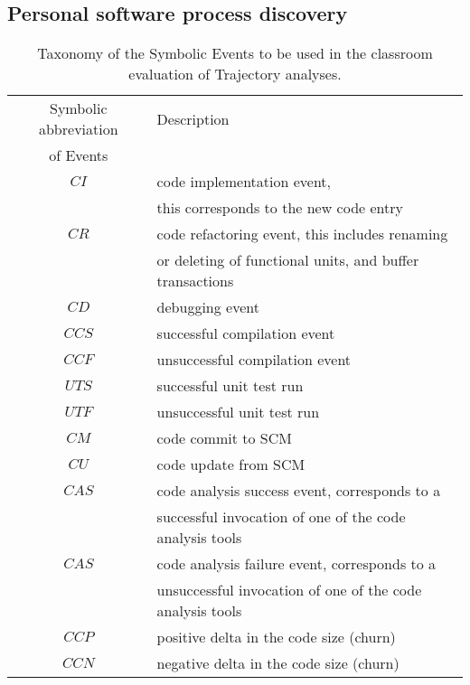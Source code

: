 \subsection{Personal software process discovery}
\begin{table}
\begin{center}
    \begin{tabular}{ | c | l | }
    \hline
    Symbolic abbreviation & Description \\ 
     of Events 						& 	  \\ 
    \hline
    $CI$                  & code implementation event, \\
    											& this corresponds to the new code entry \\
    \hline    											
    $CR$                  & code refactoring event, this includes renaming \\
    											& or deleting of functional units, and buffer transactions \\
    \hline
    $CD$                  & debugging event \\
		\hline
		$CCS$                 & successful compilation event \\
		\hline
		$CCF$                 & unsuccessful compilation event \\
    \hline
		$UTS$                 & successful unit test run \\
		\hline
		$UTF$                 & unsuccessful unit test run \\
		\hline
		$CM$                  & code commit to SCM \\
		\hline
		$CU$                  & code update from SCM \\
		\hline
    $CAS$                 & code analysis success event, corresponds to a \\
                          & successful invocation of one of the code analysis tools \\
    \hline
		$CAS$                 & code analysis failure event, corresponds to a \\
                          & unsuccessful invocation of one of the code analysis tools \\
    \hline    
    $CCP$                 & positive delta in the code size (churn) \\
    \hline
    $CCN$                 & negative delta in the code size (churn) \\
    \hline
    \end{tabular}
    \caption{Taxonomy of the Symbolic Events to be used in the classroom evaluation of Trajectory analyses.}
    \label{fig:data_collected_points}
    \end{center}
\end{table}

